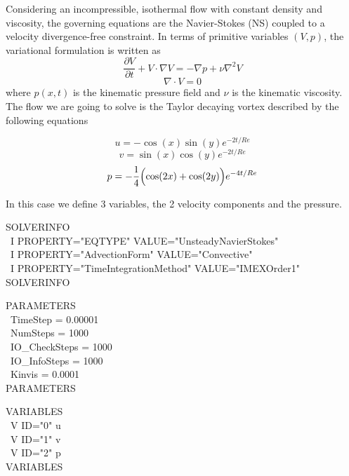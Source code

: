 \documentclass[12pt]{article}
\begin{document}
\noindent
Considering an incompressible, isothermal flow with constant density and viscosity, the governing equations are the Navier-Stokes (NS) coupled to a velocity divergence-free constraint. In terms of primitive variables $(V,p)$, the variational formulation is written as
\begin{equation}
\frac{\partial V}{\partial t} + V \cdot  \nabla V = -\nabla p + \nu \nabla^2 V
\label{eq:NS1}
\end{equation}
\begin{equation}
\nabla \cdot V = 0
\label{eq:NSequation}
\end{equation}
where $p(x,t)$ is the kinematic pressure field and $\nu$ is the kinematic viscosity. The flow we are going to solve is the Taylor decaying vortex described by the following equations

\begin{equation}
u=-\cos(x)\sin(y)e^{-2t/Re}
\label{eq:Dec1}
\end{equation}
\begin{equation}
v=\sin(x)\cos(y)e^{-2t/Re}
\label{eq:Dec2}
\end{equation}
\begin{equation}
p=-\frac{1}{4}\Bigl(\cos(2x)+\cos(2y)\Bigr)e^{-4t/Re}
\label{eq:Dec3}
\end{equation}

\noindent
In this case we define 3 variables, the 2 velocity components and the pressure.

\begin{algorithm2e}[H]
    SOLVERINFO\\\
        I PROPERTY="EQTYPE" VALUE="UnsteadyNavierStokes"\\\
        I PROPERTY="AdvectionForm" VALUE="Convective"\\\
        I PROPERTY="TimeIntegrationMethod" VALUE="IMEXOrder1"\\
      SOLVERINFO
\end{algorithm2e}
\begin{algorithm2e}[H]
    PARAMETERS\\\
     TimeStep      = 0.00001\\\               
      NumSteps      = 1000 \\\                 
      IO\_CheckSteps = 1000\\\                  
      IO\_InfoSteps  = 1000\\\                 
      Kinvis        = 0.0001\\            
    PARAMETERS\\
  \end{algorithm2e}
   \begin{algorithm2e}[H]
    VARIABLES\\\
      V ID="0" u\\\  
      V ID="1" v\\\  
      V ID="2" p\\ 
    VARIABLES\\
  \end{algorithm2e}
\end{document}
